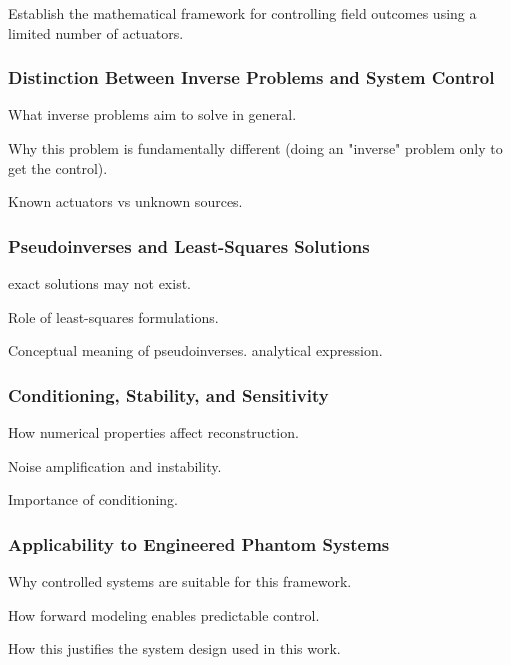Establish the mathematical framework for controlling field outcomes using a limited number of actuators.

\subsubsection{Distinction Between Inverse Problems and System Control}
What inverse problems aim to solve in general.

Why this problem is fundamentally different (doing an "inverse" problem only to get the control).

Known actuators vs unknown sources.


\subsubsection{Pseudoinverses and Least-Squares Solutions}

exact solutions may not exist.

Role of least-squares formulations.

Conceptual meaning of pseudoinverses. analytical expression.

\subsubsection{Conditioning, Stability, and Sensitivity}
How numerical properties affect reconstruction.

Noise amplification and instability.

Importance of conditioning.

\subsubsection{Applicability to Engineered Phantom Systems}
Why controlled systems are suitable for this framework.

How forward modeling enables predictable control.

How this justifies the system design used in this work.